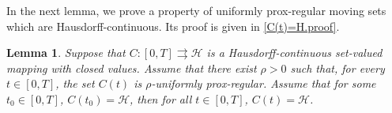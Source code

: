 \documentclass[preprint,12pt]{elsarticle}
\renewcommand{\epsilon}{\varepsilon}
\renewcommand{\H}{\mathcal{H}}
\newcommand{\tto}{\rightrightarrows}
\theoremstyle{plain}
\newtheorem{lemma}[theorem]{Lemma}
\theoremstyle{definition}
\theoremstyle{remark}
\begin{document}
In the next lemma, we prove a property of uniformly prox-regular moving sets which are Hausdorff-continuous. Its proof is given in \ref{C(t)=H.proof}.
\begin{lemma}\label{C(t)H-statement} Suppose that $C\colon [0,T]\tto \H$ is a Hausdorff-continuous set-valued mapping with closed values. Assume that there exist $\rho>0$ such that, for every $t\in[0,T]$, the set $C(t)$ is $\rho$-uniformly prox-regular. Assume that for some $t_0\in [0,T]$, $C(t_0) = \H$, then for all $t\in [0,T]$, $C(t) = \H$. 
    \end{lemma}

    
\end{document}
